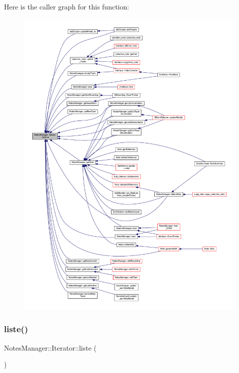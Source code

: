 Here is the caller graph for this function\+:
\nopagebreak
\begin{figure}[H]
\begin{center}
\leavevmode
\includegraphics[width=350pt]{class_notes_manager_1_1_iterator_a09b30631af5b7627b2b5a655a8ac450d_icgraph}
\end{center}
\end{figure}
\mbox{\label{class_notes_manager_1_1_iterator_a99e3eb098c3b5c7b3041731d10a18c88}} 
\subsubsection{\texorpdfstring{liste()}{liste()}}
{\footnotesize\ttfamily Notes\+Manager\+::\+Iterator\+::liste (\begin{DoxyParamCaption}{ }\end{DoxyParamCaption})\hspace{0.3cm}{\ttfamily [inline]}}



